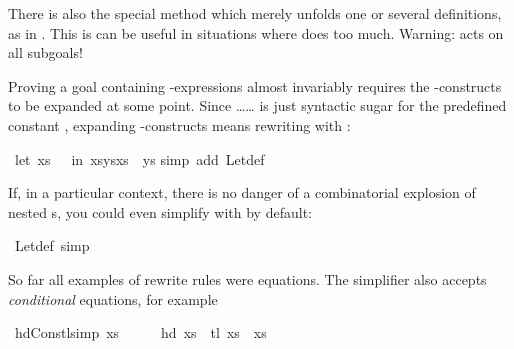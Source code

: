 \begin{isabellebody}
\begin{isamarkuptext}
There is also the special method 
which merely unfolds
one or several definitions, as in .
This is can be useful in situations where  does too much.
Warning:  acts on all subgoals!%
\end{isamarkuptext}%
\isamarkuptrue%
%
\isamarkuptrue%
%
\begin{isamarkuptext}%
%
Proving a goal containing -expressions almost invariably requires the
-con\-structs to be expanded at some point. Since
\ldots\isa{=}\ldots{} is just syntactic sugar for
the predefined constant , expanding -constructs
means rewriting with :%
\end{isamarkuptext}%
\isamarkuptrue%
\isamarkupfalse%
\ {\isachardoublequoteopen}{\isacharparenleft}let\ xs\ {\isacharequal}\ {\isacharbrackleft}{\isacharbrackright}\ in\ xs{\isacharat}ys{\isacharat}xs{\isacharparenright}\ {\isacharequal}\ ys{\isachardoublequoteclose}\isanewline
%
\isadelimproof
%
\endisadelimproof
%
\isatagproof
{}\isamarkupfalse%
{\isacharparenleft}simp\ add{\isacharcolon}\ Let{\isacharunderscore}def{\isacharparenright}\isanewline
{}\isamarkupfalse%
%
\endisatagproof
{\isafoldproof}%
%
\isadelimproof
%
\endisadelimproof
%
\begin{isamarkuptext}%
If, in a particular context, there is no danger of a combinatorial explosion
of nested s, you could even simplify with  by
default:%
\end{isamarkuptext}%
\isamarkuptrue%
\isamarkupfalse%
\ Let{\isacharunderscore}def\ {\isacharbrackleft}simp{\isacharbrackright}%
\isamarkuptrue%
%
\begin{isamarkuptext}%
%
So far all examples of rewrite rules were equations. The simplifier also
accepts \emph{conditional} equations, for example%
\end{isamarkuptext}%
\isamarkuptrue%
\isamarkupfalse%
\ hd{\isacharunderscore}Cons{\isacharunderscore}tl{\isacharbrackleft}simp{\isacharbrackright}{\isacharcolon}\ {\isachardoublequoteopen}xs\ {\isasymnoteq}\ {\isacharbrackleft}{\isacharbrackright}\ \ {\isasymLongrightarrow}\ \ hd\ xs\ {\isacharhash}\ tl\ xs\ {\isacharequal}\ xs{\isachardoublequoteclose}\isanewline

\end{isabellebody}
